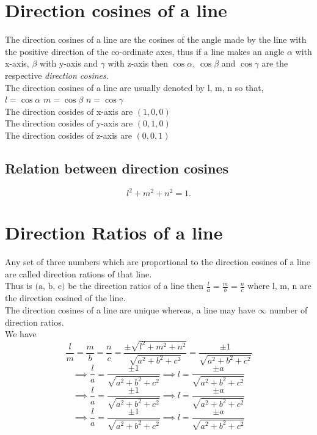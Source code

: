 \documentclass{article}
\theoremstyle{definition}
\begin{document}
\section*{Direction cosines of a line}
The direction cosines of a line are the cosines of the angle made by the line with the positive direction of the co-ordinate axes, thus if a line makes an angle $\alpha$ with x-axis, $\beta$ with y-axis and $\gamma$ with z-axis then $\cos{\alpha}$, $\cos{\beta}$ and $\cos{\gamma}$ are the respective \emph{direction cosines}.
\\
The direction cosines of a line are usually denoted by $\text{l, m, n}$ so that, \\
$l=\cos{\alpha}$  $m=\cos{\beta}$ $n=\cos{\gamma}$ \\
The direction cosides of x-axis are $(1,0,0)$ \\
The direction cosides of y-axis are $(0,1,0)$ \\
The direction cosides of z-axis are $(0,0,1)$ \\

\subsection*{Relation between direction cosines}
 \[
l^{2}+m^{2}+n^{2} = 1
.\] 

\section*{Direction Ratios of a line}
Any set of three numbers which are proportional to the direction cosines of a line are called direction rations of that line. \\
Thus is $\text{(a, b, c)}$ be the direction ratios of a line then $\frac{l}{a} = \frac{m}{b} = \frac{n}{c}$ where  $\text{l, m, n}$ are the direction cosined of the line. \\
The direction cosines of a line are unique whereas, a line may have $\infty$ number of direction ratios. \\
We have  
\[
\frac{l}{m}=\frac{m}{b}=\frac{n}{c} = \frac{\pm\sqrt{l^{2}+m^{2}+n^{2}}}{\sqrt{a^{2}+b^{2}+c^{2}}} = \frac{\pm 1}{\sqrt{a^{2}+b^{2}+c^{2}}}
\]
\[
\implies \frac{l}{a} = \frac{\pm 1}{\sqrt{a^{2}+b^{2}+c^{2}}} \implies l = \frac{\pm a}{\sqrt{a^{2}+b^{2}+c^{2}}}
\]
\[
\implies \frac{l}{a} = \frac{\pm 1}{\sqrt{a^{2}+b^{2}+c^{2}}} \implies l = \frac{\pm a}{\sqrt{a^{2}+b^{2}+c^{2}}}
\]
\[
\implies \frac{l}{a} = \frac{\pm 1}{\sqrt{a^{2}+b^{2}+c^{2}}} \implies l = \frac{\pm a}{\sqrt{a^{2}+b^{2}+c^{2}}}
\]
\end{document}
